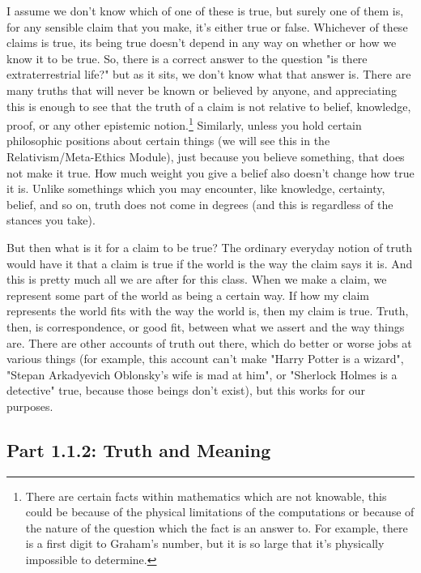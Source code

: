 I assume we don’t know which of one of these is true, but surely one of them is, for any sensible claim that you make, it's either true or false. Whichever of these claims is true, its being true doesn’t depend in any way on whether or how we know it to be true. So, there is a correct answer to the question "is there extraterrestrial life?" but as it sits, we don't know what that answer is. There are many truths that will never be known or believed by anyone, and appreciating this is enough to see that the truth of a claim is not relative to belief, knowledge, proof, or any other epistemic notion.\footnote{There are certain facts within mathematics which are not knowable, this could be because of the physical limitations of the computations or because of the nature of the question which the fact is an answer to. For example, there is a first digit to Graham's number, but it is so large that it's physically impossible to determine.} Similarly, unless you hold certain philosophic positions about certain things (we will see this in the Relativism/Meta-Ethics Module), just because you believe something, that does not make it true. How much weight you give a belief also doesn't change how true it is. Unlike somethings which you may encounter, like knowledge, certainty, belief, and so on, truth does not come in degrees (and this is regardless of the stances you take). 

But then what is it for a claim to be true? The ordinary everyday notion of truth would have it that a claim is true if the world is the way the claim says it is. And this is pretty much all we are after for this class. When we make a claim, we represent some part of the world as being a certain way. If how my claim represents the world fits with the way the world is, then my claim is true. Truth, then, is correspondence, or good fit, between what we assert and the way things are. There are other accounts of truth out there, which do better or worse jobs at various things (for example, this account can't make "Harry Potter is a wizard"\autocite{HarryPotter1}, "Stepan Arkadyevich Oblonsky's wife is mad at him"\autocite{AnnaKarenina}, or "Sherlock Holmes is a detective"\autocite{Sherlock} true, because those beings don't exist), but this works for our purposes.  

\subsection{Part 1.1.2: Truth and Meaning}
\label{s:p1.1.2}

